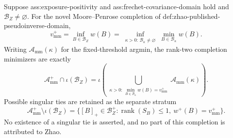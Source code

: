 Suppose ass:exposure-positivity and ass:frechet-covariance-domain hold and \(\mathcal B_Z\ne\varnothing\).  For the novel Moore--Penrose completion of def:zhao-published-pseudoinverse-domain,
\[
v_{\mathrm{mm}}^+
=\inf_{B\in\mathcal B_Z}w(B)
=\inf_{\substack{\kappa>0:\,\mathcal B_\kappa\ne\varnothing}}
\min_{B\in\mathcal B_\kappa}w(B).
\]
Writing \(\mathcal A_{\mathrm{mm}}(\kappa)\) for the fixed-threshold argmin, the rank-two completion minimizers are exactly
\[
\mathcal A_{\mathrm{mm}}^+\cap\iota(\mathcal B_Z)
=\iota\!\left(
\bigcup_{\substack{\kappa>0:\,
\min_{B\in\mathcal B_\kappa}w(B)=v_{\mathrm{mm}}^+}}
\mathcal A_{\mathrm{mm}}(\kappa)\right).
\]
Possible singular ties are retained as the separate stratum
\[
\mathcal A_{\mathrm{mm}}^+\setminus\iota(\mathcal B_Z)
=\{[B]_+\in\mathcal B_Z^+:\operatorname{rank}(S_B)\le1,\ w^+(B)=v_{\mathrm{mm}}^+\}.
\]
No existence of a singular tie is asserted, and no part of this completion is attributed to Zhao.